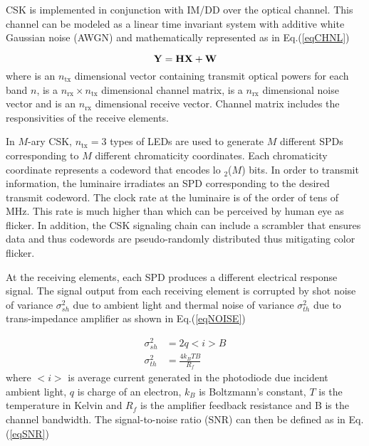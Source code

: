 %
CSK is implemented in conjunction with IM/DD over the optical channel. This channel can be modeled as a linear time invariant system with additive white Gaussian noise (AWGN) and mathematically represented as in Eq.(\ref{eqCHNL})

\begin{equation}
	{\bf{Y}} = {\bf{H}}{\bf{X}} + {\bf{W}}
	\label{eqCHNL}
\end{equation}
where  is an $n_{\text{tx}}$ dimensional vector containing transmit optical powers for each band $n$,  is a $n_{\text{rx}}\times n_{\text{tx}}$ dimensional channel matrix,  is a $n_{\text{rx}}$ dimensional noise vector and  is an $n_{\text{rx}}$ dimensional receive vector. Channel matrix  includes the responsivities of the receive elements.

In $M$-ary CSK, $n_{\text{tx}}=3$ types of LEDs are used to generate $M$ different SPDs corresponding to $M$ different chromaticity coordinates. Each chromaticity coordinate represents a codeword that encodes lo $^{ }_{2}$($M$) bits. In order to transmit information, the luminaire irradiates an SPD corresponding to the desired transmit codeword. The clock rate at the luminaire is of the order of tens of MHz. This rate is much higher than which can be perceived by human eye as flicker. In addition, the CSK signaling chain can include a scrambler that ensures data and thus codewords are pseudo-randomly distributed thus mitigating color flicker.

At the receiving elements, each SPD produces a different electrical response signal. The signal output from each receiving element is corrupted by shot noise of variance $\sigma^{2}_{sh}$ due to ambient light and thermal noise of variance $\sigma^{2}_{th}$ due to trans-impedance amplifier as shown in Eq.(\ref{eqNOISE})

\begin{equation}
	\begin{aligned}
	\sigma^{2}_{sh} &= 2q<i>B\\
	\sigma^{2}_{th} &= \frac{4k_{B}TB}{R_{f}}
\end{aligned}
\label{eqNOISE}
\end{equation}
where $<i>$ is average current generated in the photodiode due incident ambient light, $q$ is charge of an electron, $k_{B}$ is Boltzmann's constant, $T$ is the temperature in Kelvin and $R_{f}$ is the amplifier feedback resistance and B is the channel bandwidth. The signal-to-noise ratio (SNR) can then be defined as in Eq.(\ref{eqSNR})

